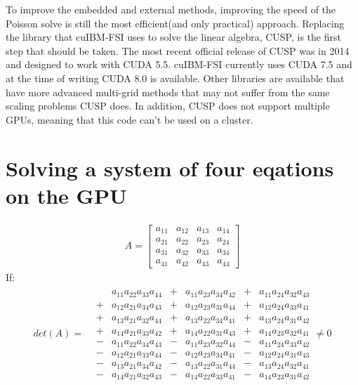 To improve the embedded and external methods, improving the speed of the Poisson solve is still the most efficient(and only practical) approach. 
Replacing the library that cuIBM-FSI uses to solve the linear algebra, CUSP, is the first step that should be taken.
The most recent official release of CUSP was in 2014 and designed to work with CUDA 5.5. 
cuIBM-FSI currently uses CUDA 7.5 and at the time of writing CUDA 8.0 is available. 
Other libraries are available that have more advanced multi-grid methods that may not suffer from the same scaling problems CUSP does. 
In addition, CUSP does not support multiple GPUs, meaning that this code can't be used on a cluster. 




\appendix
\chapter{Solving a system of four eqations on the GPU}\label{system of euqations}
\begin{gather}
	A = 
	\begin{bmatrix}
	a_{11}&a_{12}&a_{13}&a_{14}\\
	a_{21}&a_{22}&a_{23}&a_{24}\\
	a_{31}&a_{32}&a_{33}&a_{34}\\
	a_{41}&a_{42}&a_{43}&a_{44}
	\end{bmatrix}
\end{gather}
If:
\begin{gather}
det(A) =
	\begin{matrix}
		&  &a_{11}a_{22}a_{33}a_{44}& + &a_{11}a_{23}a_{34}a_{42}& + &a_{11}a_{24}a_{32}a_{43} \\
		&+ &a_{12}a_{21}a_{34}a_{43}& + &a_{12}a_{23}a_{31}a_{44}& + &a_{12}a_{24}a_{33}a_{41} \\
		&+ &a_{13}a_{21}a_{32}a_{44}& + &a_{13}a_{22}a_{34}a_{41}& + &a_{13}a_{24}a_{31}a_{42} \\
		&+ &a_{14}a_{21}a_{33}a_{42}& + &a_{14}a_{22}a_{31}a_{43}& + &a_{14}a_{23}a_{32}a_{41} \\
		&- &a_{11}a_{22}a_{34}a_{43}& - &a_{11}a_{23}a_{32}a_{44}& - &a_{11}a_{24}a_{33}a_{42} \\
		&- &a_{12}a_{21}a_{33}a_{44}& - &a_{12}a_{23}a_{34}a_{41}& - &a_{12}a_{24}a_{31}a_{43} \\
		&- &a_{13}a_{21}a_{34}a_{42}& - &a_{13}a_{22}a_{31}a_{44}& - &a_{13}a_{24}a_{32}a_{41} \\
		&- &a_{14}a_{21}a_{32}a_{43}& - &a_{14}a_{22}a_{33}a_{41}& - &a_{14}a_{23}a_{31}a_{42} 
	\end{matrix}
	\neq 0
\end{gather}

